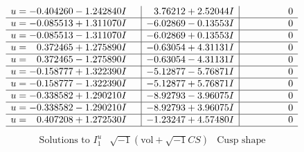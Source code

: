 \documentclass[1p]{elsarticle_modified}
\theoremstyle{definition}
\newcommand{\I}{\sqrt{-1}}
\begin{document}
$$\begin{array}{c|c|c}
\begin{aligned}
u &= -0.404260 - 1.242840 I\end{aligned}
 & \phantom{-}3.76212 + 2.52044 I & \phantom{-0.000000 } 0 \\ \hline\begin{aligned}
u &= -0.085513 + 1.311070 I\end{aligned}
 & -6.02869 - 0.13553 I & \phantom{-0.000000 } 0 \\ \hline\begin{aligned}
u &= -0.085513 - 1.311070 I\end{aligned}
 & -6.02869 + 0.13553 I & \phantom{-0.000000 } 0 \\ \hline\begin{aligned}
u &= \phantom{-}0.372465 + 1.275890 I\end{aligned}
 & -0.63054 + 4.31131 I & \phantom{-0.000000 } 0 \\ \hline\begin{aligned}
u &= \phantom{-}0.372465 - 1.275890 I\end{aligned}
 & -0.63054 - 4.31131 I & \phantom{-0.000000 } 0 \\ \hline\begin{aligned}
u &= -0.158777 + 1.322390 I\end{aligned}
 & -5.12877 - 5.76871 I & \phantom{-0.000000 } 0 \\ \hline\begin{aligned}
u &= -0.158777 - 1.322390 I\end{aligned}
 & -5.12877 + 5.76871 I & \phantom{-0.000000 } 0 \\ \hline\begin{aligned}
u &= -0.338582 + 1.290210 I\end{aligned}
 & -8.92793 - 3.96075 I & \phantom{-0.000000 } 0 \\ \hline\begin{aligned}
u &= -0.338582 - 1.290210 I\end{aligned}
 & -8.92793 + 3.96075 I & \phantom{-0.000000 } 0 \\ \hline\begin{aligned}
u &= \phantom{-}0.407208 + 1.272530 I\end{aligned}
 & -1.23247 + 4.57480 I & \phantom{-0.000000 } 0\\
 \hline 
 \end{array}$$\newpage$$\begin{array}{c|c|c}  
\text{Solutions to }I^u_{1}& \I (\text{vol} + \sqrt{-1}CS) & \text{Cusp shape}\\
 \hline 
\begin{aligned}

\end{aligned}
\end{array}$$
\end{document}
